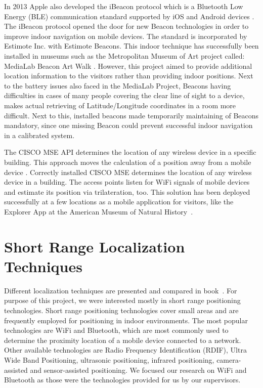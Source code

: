 In 2013 Apple also developed the iBeacon protocol which is a Bluetooth Low Energy (BLE) communication standard supported by iOS and Android devices \cite{iBeacon}. The iBeacon protocol opened the door for new Beacon technologies in order to improve indoor navigation on mobile devices. The standard is incorporated by Estimote Inc. with Estimote Beacons. This indoor technique has successfully been installed in museums such as the Metropolitan Museum of Art project called: MediaLab Beacon Art Walk \cite{MOArt15}. However, this project aimed to provide additional location information to the visitors rather than providing indoor positions. Next to the battery issues also faced in the MediaLab Project, Beacons having difficulties  in cases of many people covering the clear line of sight to a device, makes actual retrieving of Latitude/Longitude coordinates in a room more difficult. Next to this, installed beacons made  temporarily maintaining of Beacons mandatory, since one missing Beacon could prevent successful indoor navigation in a calibrated system.

The CISCO MSE API determines the location of any wireless device in a specific building. This approach moves the calculation of a position away from a mobile device \cite{oreilly11}. Correctly installed CISCO MSE determines the location of any wireless device in a building. The access points listen for WiFi signals of mobile devices and estimate its position via trilateration, too. This solution has been deployed successfully at a few locations as a mobile application for visitors, like the Explorer App at the American Museum of Natural History\ \cite{AMNH15}.


\vspace{0.5cm}

\section{Short Range Localization Techniques}
\label{short_range_localization_techniques}
Different localization techniques are presented and compared in book~\cite{brimicombe2009location}. For purpose of this project, we were interested mostly in short range positioning technologies. Short range positioning technologies cover small areas and are frequently employed for positioning in indoor environments. The most popular technologies are WiFi and Bluetooth, which are most commonly used to determine the proximity location of a mobile device connected to a network. Other available technologies are Radio Frequency Identification (RDIF), Ultra Wide Band Positioning, ultrasonic positioning, infrared positioning, camera-assisted and sensor-assisted positioning. We focused our research on WiFi and Bluetooth as those were the technologies provided for us by our supervisors.

